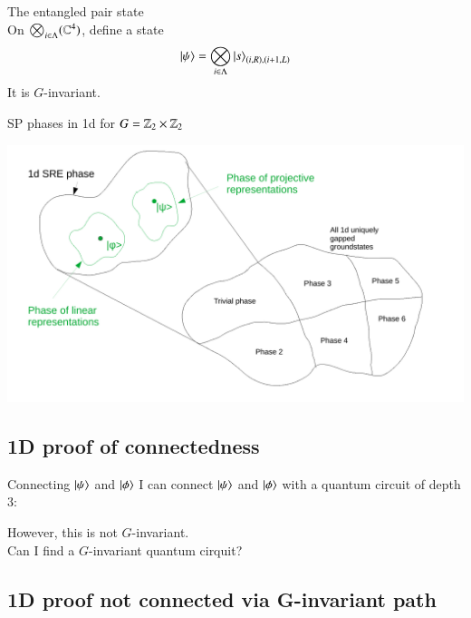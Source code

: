 \documentclass{beamer}
\begin{document}
\begin{frame}{The entangled pair state}
	\\
	On $\bigotimes_{i\in\Lambda}(\mathbb{C}^4)$, define a state
	\begin{equation*}
		\ket{\psi}=\bigotimes_{i\in\Lambda}\ket{s}_{(i,R),(i+1,L)}
	\end{equation*}
	\pause
	It is $G$-invariant.
\end{frame}

\begin{frame}{SP phases in 1d for $G=\mathbb{Z}_2\times \mathbb{Z}_2$}
	\begin{center}
		\includegraphics[width=\linewidth]{Figures/SPT_Phases_1d.pdf}
	\end{center}
\end{frame}

\subsection{1D proof of connectedness}

\begin{frame}{Connecting $\ket{\psi}$ and $\ket{\phi}$}
	I can connect $\ket{\psi}$ and $\ket{\phi}$ with a quantum circuit of depth 3:
	\begin{center}
		\scalebox{0.75}{
		
		}
	\end{center}
	\pause
	However, this is not $G$-invariant.\\
	\pause
	Can I find a $G$-invariant quantum cirquit?
\end{frame}

\subsection{1D proof not connected via G-invariant path}
\end{document}
